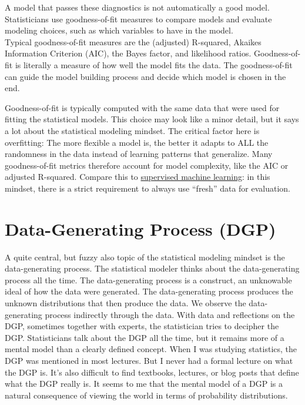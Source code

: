 \documentclass[
  10pt,
]{scrbook}
\begin{document}
A model that passes these diagnostics is not automatically a good model.
Statisticians use goodness-of-fit measures to compare models and evaluate modeling choices, such as which variables to have in the model.\\
Typical goodness-of-fit measures are the (adjusted) R-squared, Akaikes Information Criterion (AIC), the Bayes factor, and likelihood ratios.
Goodness-of-fit is literally a measure of how well the model fits the data.
The goodness-of-fit can guide the model building process and decide which model is chosen in the end.

Goodness-of-fit is typically computed with the same data that were used for fitting the statistical models.
This choice may look like a minor detail, but it says a lot about the statistical modeling mindset.
The critical factor here is overfitting: The more flexible a model is, the better it adapts to ALL the randomness in the data instead of learning patterns that generalize.
Many goodness-of-fit metrics therefore account for model complexity, like the AIC or adjusted R-squared.
Compare this to \protect\hyperlink{supervised-ml}{supervised machine learning}: in this mindset, there is a strict requirement to always use ``fresh'' data for evaluation.

\hypertarget{data-generating-process-dgp}{%
\section{Data-Generating Process (DGP)}\label{data-generating-process-dgp}}

A quite central, but fuzzy also topic of the statistical modeling mindset is the data-generating process.
The statistical modeler thinks about the data-generating process all the time.
The data-generating process is a construct, an unknowable ideal of how the data were generated.
The data-generating process produces the unknown distributions that then produce the data.
We observe the data-generating process indirectly through the data.
With data and reflections on the DGP, sometimes together with experts, the statistician tries to decipher the DGP.
Statisticians talk about the DGP all the time, but it remains more of a mental model than a clearly defined concept.
When I was studying statistics, the DGP was mentioned in most lectures.
But I never had a formal lecture on what the DGP is.
It's also difficult to find textbooks, lectures, or blog posts that define what the DGP really is.
It seems to me that the mental model of a DGP is a natural consequence of viewing the world in terms of probability distributions.
\end{document}
